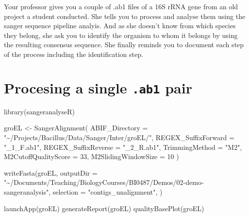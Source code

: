 \documentclass[
  letterpaper,
  DIV=11,
  numbers=noendperiod]{scrreprt}
\newenvironment{Shaded}{\begin{snugshade}}{\end{snugshade}}
\newcommand{\AttributeTok}[1]{\textcolor[rgb]{0.40,0.46,0.14}{#1}}
\newcommand{\DecValTok}[1]{\textcolor[rgb]{0.68,0.00,0.00}{#1}}
\newcommand{\FunctionTok}[1]{\textcolor[rgb]{0.28,0.35,0.67}{#1}}
\newcommand{\NormalTok}[1]{\textcolor[rgb]{0.00,0.46,0.62}{#1}}
\newcommand{\OtherTok}[1]{\textcolor[rgb]{0.00,0.46,0.62}{#1}}
\newcommand{\StringTok}[1]{\textcolor[rgb]{0.13,0.47,0.30}{#1}}
\begin{document}
\begin{tcolorbox}[standard jigsaw,toptitle=1mm, colback=white, opacitybacktitle=0.6, title=\textcolor{quarto-callout-warning-color}{\faExclamationTriangle}\hspace{0.5em}{Challenge}, toprule=.15mm, bottomtitle=1mm, colbacktitle=quarto-callout-warning-color!10!white, titlerule=0mm, arc=.35mm, colframe=quarto-callout-warning-color-frame, rightrule=.15mm, opacityback=0, bottomrule=.15mm, leftrule=.75mm, coltitle=black, left=2mm]
Your professor gives you a couple of .ab1 files of a 16S rRNA gene from
an old project a student conducted. She tells you to process and analyse
them using the sanger sequence pipeline analyis. And as she doesn't know
from which species they belong, she ask you to identify the organism to
whom it belongs by using the resulting consensus sequence. She finally
reminds you to document each step of the process including the
identification step.
\end{tcolorbox}

\hypertarget{procesing-a-single-.ab1-pair}{%
\section*{\texorpdfstring{Procesing a single \texttt{.ab1}
pair}{Procesing a single .ab1 pair}}\label{procesing-a-single-.ab1-pair}}

\begin{Shaded}
\begin{Highlighting}[]
\FunctionTok{library}\NormalTok{(sangeranalyseR)}

\NormalTok{groEL }\OtherTok{\textless{}{-}} \FunctionTok{SangerAlignment}\NormalTok{(}
  \AttributeTok{ABIF\_Directory =} \StringTok{"\textasciitilde{}/Projects/Bacillus/Data/Sanger/Inter/groEL/"}\NormalTok{,}
  \AttributeTok{REGEX\_SuffixForward =} \StringTok{"\_1\_F.ab1"}\NormalTok{,}
  \AttributeTok{REGEX\_SuffixReverse =} \StringTok{"\_2\_R.ab1"}\NormalTok{,}
  \AttributeTok{TrimmingMethod =} \StringTok{"M2"}\NormalTok{,}
  \AttributeTok{M2CutoffQualityScore =} \DecValTok{33}\NormalTok{,}
  \AttributeTok{M2SlidingWindowSize =} \DecValTok{10}
\NormalTok{)}

\FunctionTok{writeFasta}\NormalTok{(groEL, }
           \AttributeTok{outputDir =} \StringTok{"\textasciitilde{}/Documents/Teaching/BiologyCourses/BI0487/Demos/02{-}demo{-}sangeranalysis"}\NormalTok{,}
           \AttributeTok{selection =} \StringTok{"contigs\_unalignment"}\NormalTok{,}
\NormalTok{           )}

\FunctionTok{launchApp}\NormalTok{(groEL)}
\FunctionTok{generateReport}\NormalTok{(groEL)}
\FunctionTok{qualityBasePlot}\NormalTok{(groEL)}
\end{Highlighting}
\end{Shaded}
\end{document}
